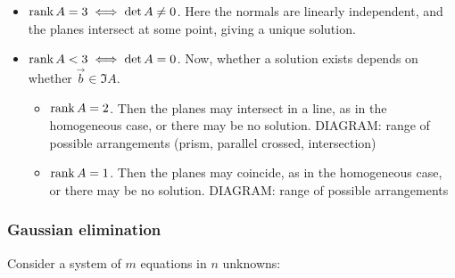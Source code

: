 \documentclass{../template/note}
\begin{document}
    \begin{itemize}
        \item \(\operatorname{rank} A = 3 \iff \det A \neq 0\). Here the normals are linearly independent, and the planes intersect at some point, giving a unique solution.
        \item \(\operatorname{rank} A < 3 \iff \det A = 0\). Now, whether a solution exists depends on whether \(\vec b \in \Im A\).
        \begin{itemize}
            \item \(\operatorname{rank} A = 2\). Then the planes may intersect in a line, as in the homogeneous case, or there may be no solution.
            DIAGRAM: range of possible arrangements (prism, parallel crossed, intersection)
            \item \(\operatorname{rank} A = 1\). Then the planes may coincide, as in the homogeneous case, or there may be no solution.
            DIAGRAM: range of possible arrangements
        \end{itemize}
    \end{itemize}
    
    \subsubsection{Gaussian elimination}

    Consider a system of \(m\) equations in \(n\) unknowns:
\end{document}
